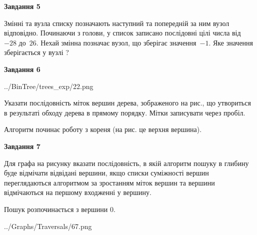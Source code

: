 \documentclass[12pt, ukrainian]{article}
\begin{document}
{\begin {large}
{\begin {center}\textbf{Завдання 5}\end {center}}\par
Змінні  та  вузла списку позначають наступний та попередній за ним вузол відповідно. Починаючи з голови, у список записано послідовні цілі числа від~$-28$ до~$26$. Нехай змінна  позначає вузол, що зберігає значення~$-1$.
Яке значення зберігається у вузлі  ?\par
\newpage

{\begin {center}\textbf{Завдання 6}\end {center}}\par

\begin{center}
	{../BinTree/trees_exp/22.png}
\end{center}
Указати послідовність міток вершин дерева, зображеного на рис., що утвориться в результаті обходу дерева в прямому порядку. Мітки записувати через пробіл.\par Алгоритм починає роботу з кореня (на рис. це верхня вершина).\par
\newpage

{\begin {center}\textbf{Завдання 7}\end {center}}\par
Для графа на рисунку вказати послідовність, в якій алгоритм пошуку в глибину буде відмічати відвідані вершини, якщо списки суміжності вершин переглядаються алгоритмом за зростанням міток вершин та вершини відмічаються на першому вход\-женні у вершину.\par
Пошук розпочинається з вершини 0.\par

\begin{center}
	{../Graphs/Traversals/67.png}
\end{center}\par
\newpage


\end{large}}
\end{document}
